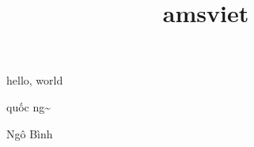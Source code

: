 \documentclass{amsart}
\title{amsviet}
\begin{document}
\maketitle

hello, world


{\vietenc qu\'{\^o}c ng\~{}}

Ng\^{o}  B\`inh

\end{document}
